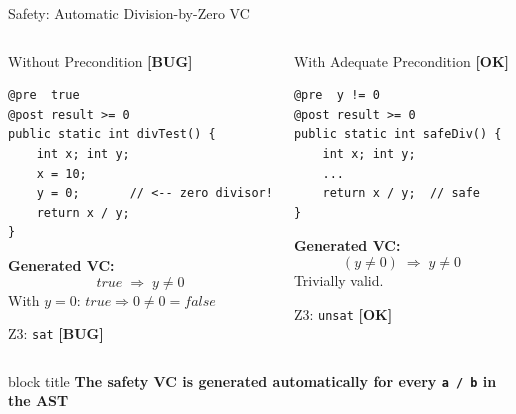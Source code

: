 \documentclass[aspectratio=169,11pt]{beamer}
\newcommand{\ok}{\textcolor{accent}{\textbf{[OK]}}}
\newcommand{\bug}{\textcolor{warn}{\textbf{[BUG]}}}
\begin{document}
\begin{frame}[fragile]{Safety: Automatic Division-by-Zero VC}

\begin{columns}[t]
  \begin{alertblock}{Without Precondition \bug}
\begin{lstlisting}[style=javaslide,basicstyle=\ttfamily\small,numbers=none]
@pre  true
@post result >= 0
public static int divTest() {
    int x; int y;
    x = 10;
    y = 0;       // <-- zero divisor!
    return x / y;
}
\end{lstlisting}
    \medskip
    \textbf{Generated VC:}
    \[ \mathit{true} \;\Rightarrow\; y \neq 0 \]
    With $y = 0$: \;$\mathit{true} \Rightarrow 0 \neq 0 = \mathit{false}$

    \medskip
    Z3: \texttt{sat} \hfill\bug
  \end{alertblock}

  \begin{exampleblock}{With Adequate Precondition \ok}
\begin{lstlisting}[style=javaslide,basicstyle=\ttfamily\small,numbers=none]
@pre  y != 0
@post result >= 0
public static int safeDiv() {
    int x; int y;
    ...
    return x / y;  // safe
}
\end{lstlisting}
    \medskip
    \textbf{Generated VC:}
    \[ (y \neq 0) \;\Rightarrow\; y \neq 0 \]
    Trivially valid.

    \medskip
    Z3: \texttt{unsat} \hfill\ok
  \end{exampleblock}
\end{columns}

\vspace{0.3cm}
\begin{beamercolorbox}[rounded=true,center,wd=0.88\textwidth]{block title}
  \centering\small\bfseries
  The safety VC is generated automatically for every \texttt{a / b} in the AST
\end{beamercolorbox}
\end{frame}
\end{document}
